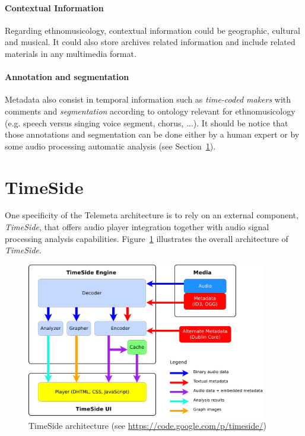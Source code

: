 \documentclass[runningheads,a4paper]{llncs}
\begin{document}
\paragraph{Contextual Information}
Regarding ethnomusicology, contextual information could be geographic, cultural and musical. It could also store archives related information and include related materials in any multimedia format. \vspace{-0.2cm}
\paragraph{Annotation and segmentation}
Metadata also consist in temporal information such as \emph{time-coded makers} with comments and \emph{segmentation} according to ontology relevant for ethnomusicology (e.g. speech versus singing voice segment, chorus, ...).
It should be notice that those annotations and segmentation can be done either by a human expert or by some audio processing automatic analysis (see Section~\ref{sec:Timeside}).


\section{TimeSide}\label{sec:Timeside}\vspace{-0.2cm}
One specificity of the Telemeta architecture is to rely on an external component, \emph{TimeSide}, that offers audio player integration together with audio signal processing analysis capabilities. Figure~\ref{fig:TimeSide_Archi} illustrates the overall architecture of \emph{TimeSide}.

\begin{figure}[htbp]
  \centering
  \includegraphics[width=10.5cm]{img/timeside_schema.pdf}
  \caption{TimeSide architecture (see \url{https://code.google.com/p/timeside/})}\label{fig:TimeSide_Archi}
\end{figure}
\end{document}
